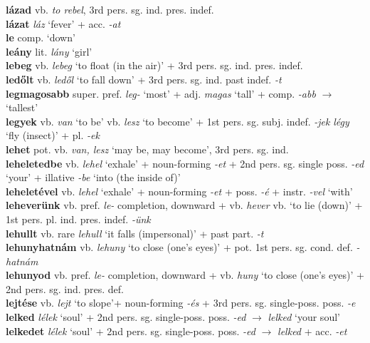 \documentclass[11pt]{article}
\begin{document}
\textbf{lázad} vb. \emph{to rebel}, 3rd pers. sg. ind. pres. indef. \\
\textbf{lázat} \emph{láz} `fever' + acc. \emph{-at} \\
\textbf{le} comp. `down' \\
\textbf{leány} lit. \emph{lány} `girl' \\
\textbf{lebeg} vb. \emph{lebeg} `to float (in the air)' + 3rd
  pers. sg. ind. pres. indef. \\
\textbf{ledőlt} vb. \emph{ledől} `to fall down' + 3rd
pers. sg. ind. past indef. \emph{-t} \\
\textbf{legmagosabb} super. pref. \emph{leg-} `most' +
adj. \emph{magas} `tall' + comp. \emph{-abb} $\rightarrow$
`tallest' \\
\textbf{legyek} vb. \emph{van} `to be' \textbar\textbar{}
vb. \emph{lesz} `to become' + 1st
pers. sg. subj. indef. \emph{-jek} \textbar\textbar{} \emph{légy} `fly
(insect)' + pl. \emph{-ek} \\
\textbf{lehet} pot. vb. \emph{van, lesz} `may be, may become', 3rd
pers. sg. ind. \\
\textbf{leheletedbe} vb. \emph{lehel} `exhale' +
noun\hyp{}forming \emph{-et} + 2nd pers. sg. single
poss. \emph{-ed} `your' + illative \emph{-be}
`into (the inside of)' \\
\textbf{leheletével} vb. \emph{lehel} `exhale' +
noun\hyp{}forming \emph{-et} + poss. \emph{-é} + instr. \emph{-vel} `with' \\
\textbf{leheverünk} vb. pref. \emph{le-} completion, downward +
vb. \emph{hever} vb. `to lie (down)' + 1st
pers. pl. ind. pres. indef. \emph{-ünk} \\
\textbf{lehullt} vb. rare \emph{lehull} `it falls (impersonal)' + past
part. \emph{-t} \\
\textbf{lehunyhatnám} vb. \emph{lehuny} `to close (one's eyes)' + pot. 1st pers. sg. cond. def. \emph{-hatnám} \\
\textbf{lehunyod} vb. pref. \emph{le-} completion, downward +
vb. \emph{huny} `to close (one's eyes)' + 2nd
pers. sg. ind. pres. def. \\
\textbf{lejtése} vb. \emph{lejt} `to slope'+
noun\hyp{}forming \emph{-és} + 3rd
pers. sg. single\hyp{}poss. poss. \emph{-e} \\
\textbf{lelked} \emph{lélek} `soul' + 2nd
  pers. sg. single\hyp{}poss. poss. \emph{-ed}
  $\rightarrow$ \emph{lelked} `your soul' \\
\textbf{lelkedet} \emph{lélek} `soul' + 2nd
  pers. sg. single\hyp{}poss. poss. \emph{-ed} $\rightarrow$ \emph{lelked} + acc. \emph{-et} \\
\end{document}
